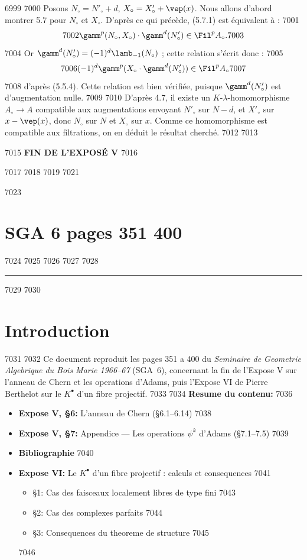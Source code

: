   6999	%
  7000	Posons $N_\circ = N'_\circ + d$, $X_\circ = X'_\circ + \vep(x)$. Nous allons d'abord montrer 5.7 pour $N_\circ$ et $X_\circ$. D'apr\`es ce qui pr\'ec\`ede, (5.7.1) est \'equivalent \`a :
  7001	\[
  7002	\gamm^p(N_\circ, X_\circ) \cdot \gamm^d(N'_\circ) \in \Fil^p A_\circ.
  7003	\]
  7004	Or $\gamm^d(N'_\circ) = (-1)^d \lamb_{-1}(N_\circ)$ ; cette relation s'\'ecrit donc :
  7005	\[
  7006	(-1)^d \gamm^p(X_\circ \cdot \gamm^d(N'_\circ)) \in \Fil^p A_\circ
  7007	\]
  7008	d'apr\`es (5.5.4). Cette relation est bien v\'erifi\'ee, puisque $\gamm^d(N'_\circ)$ est d'augmentation nulle.
  7009	
  7010		D'apr\`es 4.7, il existe un $K$-$\lambda$-homomorphisme $A_\circ \to A$ compatible aux augmentations envoyant $N'_\circ$ sur $N-d$, et $X'_\circ$ sur $x - \vep(x)$, donc $N_\circ$ sur $N$ et $X_\circ$ sur $x$. Comme ce homomorphisme est compatible aux filtrations, on en d\'eduit le r\'esultat cherch\'e.
  7012	
  7013		\begin{center}
  7015	\textbf{FIN DE L'EXPOS\'E V}
  7016	\end{center}
  7017	
  7018	
  7019		%
  7021		
  7023	\section*{SGA 6 pages 351 400}
  7024	\setcounter{page}{351}
  7025	
  7026	\thispagestyle{fancy}
  7027	
  7028	\noindent\rule{\textwidth}{0.5pt}
  7029	
  7030	\section*{Introduction}
  7031	
  7032	Ce document reproduit les pages 351 a 400 du \emph{Seminaire de Geometrie Algebrique du Bois Marie 1966--67} (SGA~6), concernant la fin de l'Expose V sur l'anneau de Chern et les operations d'Adams, puis l'Expose VI de Pierre Berthelot sur le $K^{\bullet}$ d'un fibre projectif.
  7033	
  7034		\noindent\textbf{Resume du contenu:}
  7036	\begin{itemize}[leftmargin=2em]
  7037	\item \textbf{Expose V, \S 6:} L'anneau de Chern (\S 6.1--6.14)
  7038	\item \textbf{Expose V, \S 7:} Appendice --- Les operations $\psi^k$ d'Adams (\S 7.1--7.5)
  7039	\item \textbf{Bibliographie}
  7040	\item \textbf{Expose VI:} Le $K^{\bullet}$ d'un fibre projectif : calculs et consequences
  7041	\begin{itemize}
  7042	\item \S 1: Cas des faisceaux localement libres de type fini
  7043	\item \S 2: Cas des complexes parfaits
  7044	\item \S 3: Consequences du theoreme de structure
  7045	\end{itemize}
  7046	\end{itemize}
